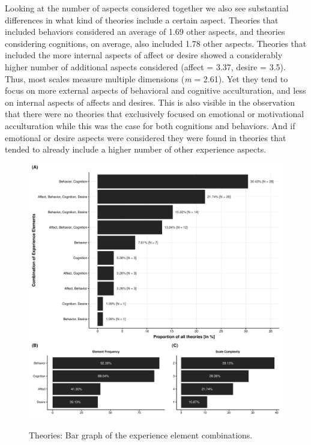 Looking at the number of aspects considered together we also see
substantial differences in what kind of theories include a certain
aspect. Theories that included behaviors considered an average of 1.69
other aspects, and theories considering cognitions, on average, also
included 1.78 other aspects. Theories that included the more internal
aspects of affect or desire showed a considerably higher number of
additional aspects considered (affect = 3.37, desire = 3.5). Thus, most
scales measure multiple dimensions (\textit{m} = 2.61). Yet they tend to
focus on more external aspects of behavioral and cognitive
acculturation, and less on internal aspects of affects and desires. This
is also visible in the observation that there were no theories that
exclusively focused on emotional or motivational acculturation while
this was the case for both cognitions and behaviors. And if emotional or
desire aspects were considered they were found in theories that tended
to already include a higher number of other experience aspects.

\begin{figure}[h]
\centering
\caption{Theories: Bar graph of the experience element combinations.}
\includegraphics[width=\textwidth]{Figures/TheoriesFreq-1}
\label{fig:ElementsTheories}
\end{figure}

